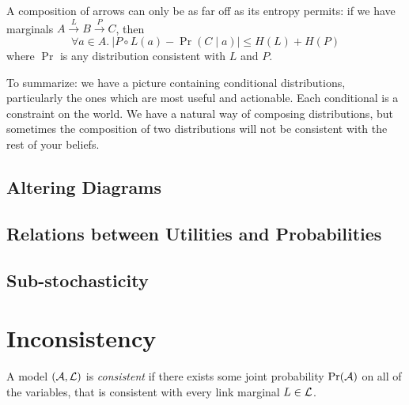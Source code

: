 \documentclass{article}
\begin{document}
	\begin{conj}
		A composition of arrows can only be as far off as its entropy permits: if we have marginals $A \xrightarrow{L} B \xrightarrow{P} C$, then
		\[ \forall a \in A.~ \Big|  P\circ L (a) - \Pr(C \mid a) \Big|  \leq H(L) + H(P) \]
		where $\Pr$ is any distribution consistent with $L$ and $P$.
	\end{conj}

	To summarize: we have a picture containing conditional distributions, particularly the ones which are most useful and actionable. Each conditional is a constraint on the world. We have a natural way of composing distributions, but sometimes the composition of two distributions will not be consistent with the rest of your beliefs.
	
	\subsection{Altering Diagrams}
	
	\subsection{Relations between Utilities and Probabilities}
	
	\subsection{Sub-stochasticity}
	
	\section{Inconsistency}\label{sec:inconsistency-ex}
		
	\begin{defn}[consistency]
		A model $(\cal A, L)$ is \emph{consistent} if there exists some joint probability $\Pr(\cal A)$ on all of the variables, that is consistent with every link marginal $L \in \cal L$.
	\end{defn}
\end{document}
